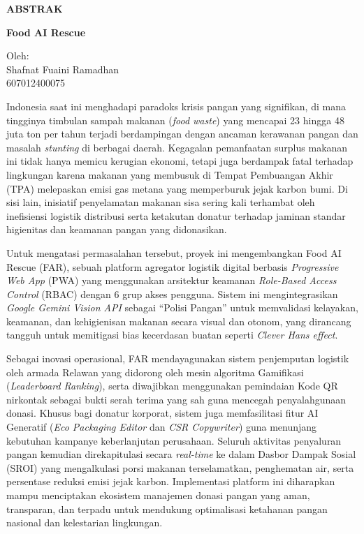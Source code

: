 \newpage
\begin{center}
    {\Large\bfseries ABSTRAK \par}
    {\large\bfseries Food AI Rescue \par}
    Oleh: \\
    Shafnat Fuaini Ramadhan \\
    607012400075 \\
\end{center}
Indonesia saat ini menghadapi paradoks krisis pangan yang signifikan, di mana tingginya timbulan sampah makanan (\textit{food waste}) yang mencapai 23 hingga 48 juta ton per tahun terjadi berdampingan dengan ancaman kerawanan pangan dan masalah \textit{stunting} di berbagai daerah. Kegagalan pemanfaatan surplus makanan ini tidak hanya memicu kerugian ekonomi, tetapi juga berdampak fatal terhadap lingkungan karena makanan yang membusuk di Tempat Pembuangan Akhir (TPA) melepaskan emisi gas metana yang memperburuk jejak karbon bumi. Di sisi lain, inisiatif penyelamatan makanan sisa sering kali terhambat oleh inefisiensi logistik distribusi serta ketakutan donatur terhadap jaminan standar higienitas dan keamanan pangan yang didonasikan.

Untuk mengatasi permasalahan tersebut, proyek ini mengembangkan Food AI Rescue (FAR), sebuah platform agregator logistik digital berbasis \textit{Progressive Web App} (PWA) yang menggunakan arsitektur keamanan \textit{Role-Based Access Control} (RBAC) dengan 6 grup akses pengguna. Sistem ini mengintegrasikan \textit{Google Gemini Vision API} sebagai ``Polisi Pangan'' untuk memvalidasi kelayakan, keamanan, dan kehigienisan makanan secara visual dan otonom, yang dirancang tangguh untuk memitigasi bias kecerdasan buatan seperti \textit{Clever Hans effect}.

Sebagai inovasi operasional, FAR mendayagunakan sistem penjemputan logistik oleh armada Relawan yang didorong oleh mesin algoritma Gamifikasi (\textit{Leaderboard Ranking}), serta diwajibkan menggunakan pemindaian Kode QR nirkontak sebagai bukti serah terima yang sah guna mencegah penyalahgunaan donasi. Khusus bagi donatur korporat, sistem juga memfasilitasi fitur AI Generatif (\textit{Eco Packaging Editor} dan \textit{CSR Copywriter}) guna menunjang kebutuhan kampanye keberlanjutan perusahaan. Seluruh aktivitas penyaluran pangan kemudian direkapitulasi secara \textit{real-time} ke dalam Dasbor Dampak Sosial (SROI) yang mengalkulasi porsi makanan terselamatkan, penghematan air, serta persentase reduksi emisi jejak karbon. Implementasi platform ini diharapkan mampu menciptakan ekosistem manajemen donasi pangan yang aman, transparan, dan terpadu untuk mendukung optimalisasi ketahanan pangan nasional dan kelestarian lingkungan.

